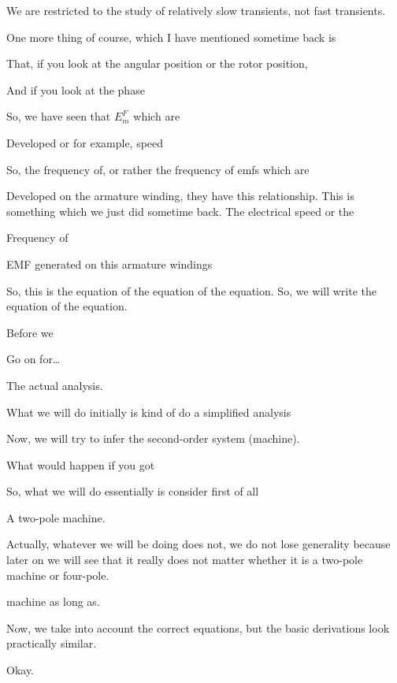 \documentclass{article}
\begin{document}
We are restricted to the study of relatively slow transients, not fast transients.

One more thing of course, which I have mentioned sometime back is

That, if you look at the angular position or the rotor position,

And if you look at the phase

So, we have seen that $E_m^F$ which are

Developed or for example, speed

So, the frequency of, or rather the frequency of emfs which are

Developed on the armature winding, they have this relationship. This is something which we just did sometime back. The electrical speed or the

Frequency of

EMF generated on this armature windings

So, this is the equation of the equation of the equation. So, we will write the equation of the equation.

Before we

Go on for…

The actual analysis.

What we will do initially is kind of do a simplified analysis

Now, we will try to infer the second-order system (machine).

What would happen if you got

So, what we will do essentially is consider first of all

A two-pole machine.

Actually, whatever we will be doing does not, we do not lose generality because later on we will see that it really does not matter whether it is a two-pole machine or four-pole.

machine as long as.

Now, we take into account the correct equations, but the basic derivations look practically similar.

Okay.
\end{document}
